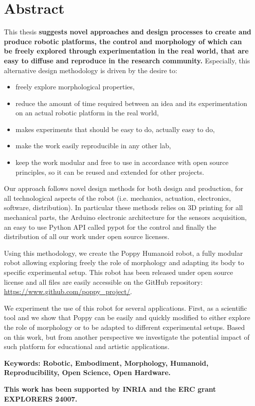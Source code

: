 %
\chapter*{Abstract}
\label{cha:abstract}
\vspace*{-10mm}

This thesis \textbf{suggests novel approaches and design processes to create and produce robotic platforms,  the control and morphology of which can be freely explored through experimentation in the real world,  that are easy to diffuse and reproduce in the research community.} Especially, this alternative design methodology is driven by the desire to:
\begin{itemize}
    \item freely explore morphological properties,
    \item reduce the amount of time required between an idea and its experimentation on an actual robotic platform in the real world,
    \item makes experiments that should be easy to do, actually easy to do,
    \item make the work easily reproducible in any other lab,
    \item keep the work modular and free to use in accordance with open source principles, so it can be reused and extended for other projects.
\end{itemize}

Our approach follows novel design methods for both design and production, for all technological aspects of the robot (i.e. mechanics, actuation, electronics, software, distribution). In particular these methods relies on 3D printing for all mechanical parts, the Arduino electronic architecture for the sensors acquisition, an easy to use Python API called pypot for the control and finally the distribution of all our work under open source licenses.

Using this methodology, we create the Poppy Humanoid robot, a fully modular robot allowing exploring freely the role of morphology and adapting its body to specific experimental setup. This robot has been released under open source license and all files are easily accessible on the GitHub repository: \url{https://www.github.com/poppy_project/}.

We experiment the use of this robot for several applications. First, as a scientific tool and we show that Poppy can be easily and quickly modified to either explore the role of morphology or to be adapted to different experimental setups.
Based on this work, but from another perspective we investigate the potential impact of such platform for educational and artistic applications.

\textbf{Keywords: Robotic, Embodiment, Morphology, Humanoid, Reproducibility, Open Science, Open Hardware.} 

\textbf{This work has been supported by INRIA and the ERC grant EXPLORERS 24007.}

